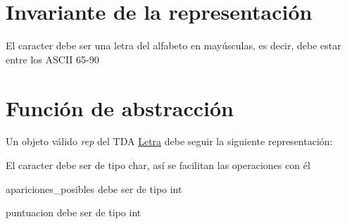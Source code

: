 \hypertarget{repLetra_invLetra}{}\section{Invariante de la representación}\label{repLetra_invLetra}

\begin{DoxyItemize}
\item El caracter debe ser una letra del alfabeto en mayúsculas, es decir, debe estar entre los A\+S\+C\+II 65-\/90 
\end{DoxyItemize}\hypertarget{repLetra_faLetra}{}\section{Función de abstracción}\label{repLetra_faLetra}
Un objeto válido {\itshape rep} del T\+DA \hyperlink{classLetra}{Letra} debe seguir la siguiente representación\+:
\begin{DoxyItemize}
\item El caracter debe ser de tipo char, así se facilitan las operaciones con él
\item apariciones\+\_\+posibles debe ser de tipo int
\item puntuacion debe ser de tipo int 
\end{DoxyItemize}